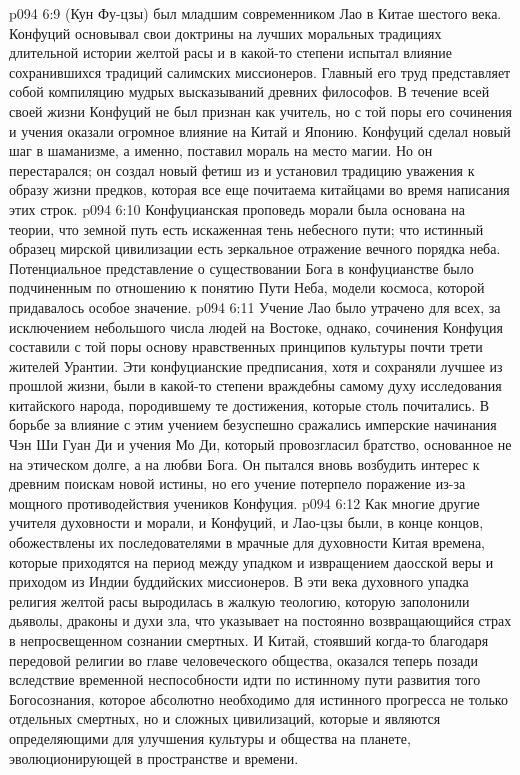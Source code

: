 \vs p094 6:9 \pc {} (Кун Фу\hyp{}цзы) был младшим современником Лао в Китае шестого века. Конфуций основывал свои доктрины на лучших моральных традициях длительной истории желтой расы и в какой\hyp{}то степени испытал влияние сохранившихся традиций салимских миссионеров. Главный его труд представляет собой компиляцию мудрых высказываний древних философов. В течение всей своей жизни Конфуций не был признан как учитель, но с той поры его сочинения и учения оказали огромное влияние на Китай и Японию. Конфуций сделал новый шаг в шаманизме, а именно, поставил мораль на место магии. Но он перестарался; он создал новый фетиш из  и установил традицию уважения к образу жизни предков, которая все еще почитаема китайцами во время написания этих строк.
\vs p094 6:10 Конфуцианская проповедь морали была основана на теории, что земной путь есть искаженная тень небесного пути; что истинный образец мирской цивилизации есть зеркальное отражение вечного порядка неба. Потенциальное представление о существовании Бога в конфуцианстве было подчиненным по отношению к понятию Пути Неба, модели космоса, которой придавалось особое значение.
\vs p094 6:11 Учение Лао было утрачено для всех, за исключением небольшого числа людей на Востоке, однако, сочинения Конфуция составили с той поры основу нравственных принципов культуры почти трети жителей Урантии. Эти конфуцианские предписания, хотя и сохраняли лучшее из прошлой жизни, были в какой\hyp{}то степени враждебны самому духу исследования китайского народа, породившему те достижения, которые столь почитались. В борьбе за влияние с этим учением безуспешно сражались имперские начинания Чэн Ши Гуан Ди и учения Мо Ди, который провозгласил братство, основанное не на этическом долге, а на любви Бога. Он пытался вновь возбудить интерес к древним поискам новой истины, но его учение потерпело поражение из\hyp{}за мощного противодействия учеников Конфуция.
\vs p094 6:12 Как многие другие учителя духовности и морали, и Конфуций, и Лао\hyp{}цзы были, в конце концов, обожествлены их последователями в мрачные для духовности Китая времена, которые приходятся на период между упадком и извращением даосской веры и приходом из Индии буддийских миссионеров. В эти века духовного упадка религия желтой расы выродилась в жалкую теологию, которую заполонили дьяволы, драконы и духи зла, что указывает на постоянно возвращающийся страх в непросвещенном сознании смертных. И Китай, стоявший когда\hyp{}то благодаря передовой религии во главе человеческого общества, оказался теперь позади вследствие временной неспособности идти по истинному пути развития того Богосознания, которое абсолютно необходимо для истинного прогресса не только отдельных смертных, но и сложных цивилизаций, которые и являются определяющими для улучшения культуры и общества на планете, эволюционирующей в пространстве и времени.
